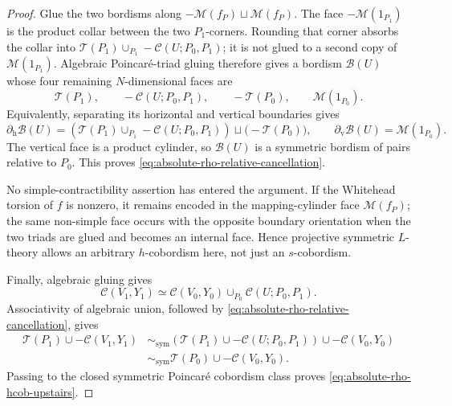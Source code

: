 \documentclass[10pt,reqno]{amsart}
\numberwithin{equation}{section}
\theoremstyle{definition}
\theoremstyle{remark}
\begin{document}
\begin{proof}
Glue the two bordisms along
\(-\mathcal M(f_P)\sqcup\mathcal M(f_P)\).  The face
\(-\mathcal M(1_{P_1})\) is the product collar between the two
\(P_1\)-corners.  Rounding that corner absorbs the collar into
\(\mathcal T(P_1)\cup_{P_1}-\mathcal C(U;P_0,P_1)\); it is not glued
to a second copy of \(\mathcal M(1_{P_1})\).  Algebraic
Poincar\'e-triad gluing therefore gives a bordism \(\mathcal B(U)\)
whose four remaining \(N\)-dimensional faces are
\[
\mathcal T(P_1),
\qquad
-\mathcal C(U;P_0,P_1),
\qquad
-\mathcal T(P_0),
\qquad
\mathcal M(1_{P_0}).
\]
Equivalently, separating its horizontal and vertical boundaries gives
\[
\partial_{\mathrm h}\mathcal B(U)
=
\left(
\mathcal T(P_1)
\cup_{P_1}-\mathcal C(U;P_0,P_1)
\right)
\sqcup\bigl(-\mathcal T(P_0)\bigr),
\qquad
\partial_{\mathrm v}\mathcal B(U)
=
\mathcal M(1_{P_0}).
\]
The vertical face is a product cylinder, so \(\mathcal B(U)\) is a
symmetric bordism of pairs relative to \(P_0\).  This
proves \eqref{eq:absolute-rho-relative-cancellation}.

No simple-contractibility assertion has entered the argument.  If the
Whitehead torsion of \(f\) is nonzero, it remains encoded in the
mapping-cylinder face \(\mathcal M(f_P)\); the same non-simple face
occurs with the opposite boundary orientation when the two triads are
glued and becomes an internal face.  Hence projective symmetric \(L\)-theory
allows an arbitrary \(h\)-cobordism here, not just an
\(s\)-cobordism.

Finally, algebraic gluing gives
\[
\mathcal C(V_1,Y_1)
\simeq
\mathcal C(V_0,Y_0)
\cup_{P_0}
\mathcal C(U;P_0,P_1).
\]
Associativity of algebraic union, followed by
\eqref{eq:absolute-rho-relative-cancellation}, gives
\begin{align*}
\mathcal T(P_1)\cup-\mathcal C(V_1,Y_1)
&\sim_{\mathrm{sym}}
\left(
\mathcal T(P_1)\cup-\mathcal C(U;P_0,P_1)
\right)
\cup-\mathcal C(V_0,Y_0)\\
&\sim_{\mathrm{sym}}
\mathcal T(P_0)\cup-\mathcal C(V_0,Y_0).
\end{align*}
Passing to the closed symmetric Poincar\'e cobordism class proves
\eqref{eq:absolute-rho-hcob-upstairs}.
\end{proof}
\end{document}
